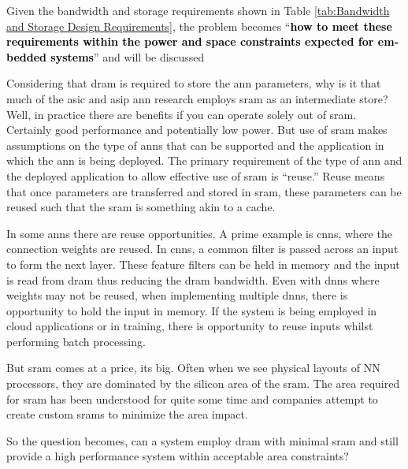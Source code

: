 Given the bandwidth and storage requirements shown in Table \ref{tab:Bandwidth and Storage Design Requirements}, 
the problem becomes \hyphenquote{american}{\textbf{\textcolor{black}{how to meet these requirements within the power and space constraints expected for embedded systems}}} and will be discussed

\iffalse
Considering that \ac{dram} is required to store the \ac{ann} parameters, why is it that much of the \ac{asic} and \ac{asip} \ac{ann} research employs \ac{sram} as an intermediate store? Well, in practice there are benefits if you can operate solely out of \ac{sram}.
Certainly good performance and potentially low power.
But use of \ac{sram} makes assumptions on the type of \acp{ann} that can be supported and the application in which the \ac{ann} is being deployed.
The primary requirement of the type of \ac{ann} and the deployed application to allow effective use of \ac{sram} is ``reuse.'' Reuse means that once parameters are transferred and stored in \ac{sram}, these parameters can be reused such that the \ac{sram} \iffalse isn't simply an intermediate memory but \fi is something akin to a cache.

In some \ac{ann}s there are reuse opportunities. A prime example is \acp{cnn}, where the connection weights are reused. In \acp{cnn}, a common filter is passed across an input to form the next layer. These feature filters can be held in memory and the input is read from \ac{dram} thus reducing the \ac{dram} bandwidth.
Even with \ac{dnn}s where weights may not be reused, when implementing multiple \ac{dnn}s, there is opportunity to hold the input in memory.
If the system is being employed in cloud applications or in training, there is opportunity to reuse inputs whilst performing batch processing.

But \ac{sram} comes at a price, its big. Often when we see physical layouts of NN processors, they are dominated by the silicon area of the \ac{sram}. The area required for \ac{sram} has been understood for quite some time and companies attempt to create custom \acp{sram} to minimize the area impact.

So the question becomes, can a system employ \ac{dram} with minimal \ac{sram} and still provide a high performance system within acceptable area constraints?


